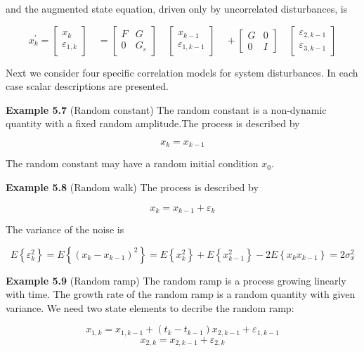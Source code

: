 	and the augmented state equation, driven only by uncorrelated disturbances, is
	
	\begin{equation}\label{5.26}
	 x_{k}^{'}=\begin{bmatrix} x_{k}  \\ \varepsilon_{1,k}\end{bmatrix} \quad=\begin{bmatrix} F&G  \\ 0&G_{\varepsilon}\end{bmatrix} \quad \begin{bmatrix} x_{k-1}  \\ \varepsilon_{1,k-1}\end{bmatrix} \quad
	+ \begin{bmatrix} G&0 \\ 0&I\end{bmatrix} \quad \begin{bmatrix} \varepsilon_{2,k-1}  \\ \varepsilon_{3,k-1}\end{bmatrix} 
	\end{equation}
 
	
	Next we consider four specific correlation models for system disturbances. In each case scalar descriptions are presented.
	
	\textbf{Example 5.7} (Random constant) The random constant is a non-dynamic quantity with a fixed random amplitude.The process is described by
	
	\[ x_{k}=x_{k-1} \]
	
	The random constant may have a random initial condition $ x_{0} $.
	
	\textbf{Example 5.8} (Random walk) The process is described by
	
	\[ x_{k}=x_{k-1}+\varepsilon_{k} \]
	
	The variance of the noise is 
	
	\[ E\left\lbrace \varepsilon_{k}^{2}\right\rbrace = E\left\lbrace(x_{k}-x_{k-1})^{2} \right\rbrace =E\left\lbrace x_{k}^{2} \right\rbrace +E\left\lbrace x_{k-1}^{2} \right\rbrace -2E\left\lbrace x_{k}x_{k-1} \right\rbrace =2\sigma_{x}^{2} \]
	
	\textbf{Example 5.9} (Random ramp) The random ramp is a process growing linearly with time. The growth rate of the random ramp is a random quantity with given variance. We need two state elements to decribe the random ramp:
	
	\[ x_{1,k}=x_{1,k-1}+(t_{k}-t_{k-1})x_{2,k-1}+\varepsilon_{1,k-1} \]
	\[ x_{2,k}=x_{2,k-1}+\varepsilon_{2,k} \]
	
